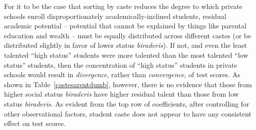 \documentclass[Eubank_pk_ethnic_sorting.tex]{subfiles}
\begin{document}
For it to be the case that sorting by caste reduces the degree to which private schools enroll disproportionately academically-inclined students, residual academic potential -- potential that cannot be explained by things like parental education and wealth -- must be equally distributed across different castes (or be distributed slightly in favor of lower status \emph{biraderis}). If not, and even the least talented ``high status'' students were more talented than the most talented ``low status'' students, then the concentration of ``high status'' students in private schools would result in \emph{divergence}, rather than \emph{convergence}, of test scores. As shown in Table~\ref{castesarentdumb}, however, there is no evidence that those from higher social status \emph{biraderis} have higher residual talent than those from low status \emph{biraderis}. As evident from the top row of coefficients, after controlling for other observational factors, student caste does not appear to have any consistent effect on test scores.


\end{document}
